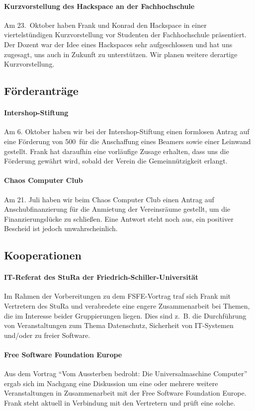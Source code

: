 \documentclass[10pt,DIV16]{scrartcl}
\begin{document}
\paragraph{Kurzvorstellung des Hackspace an der Fachhochschule}

Am 23.~Oktober haben Frank und Konrad den Hackspace in einer viertelstündigen
Kurzvorstellung vor Studenten der Fachhochschule präsentiert.  Der Dozent war
der Idee eines Hackspaces sehr aufgeschlossen und hat uns zugesagt, uns auch
in Zukunft zu unterstützen.  Wir planen weitere derartige Kurzvorstellung.

\subsection{Förderanträge}

\paragraph{Intershop-Stiftung}

Am 6. Oktober haben wir bei der Intershop-Stiftung einen formlosen
Antrag auf eine Förderung von 500\EUR\ für die Anschaffung eines
Beamers sowie einer Leinwand gestellt.  Frank hat daraufhin eine
vorläufige Zusage erhalten, dass uns die Förderung gewährt wird,
sobald der Verein die Gemeinnützigkeit erlangt.

\paragraph{Chaos Computer Club}

Am 21. Juli haben wir beim Chaos Computer Club einen Antrag auf
Anschubfinanzierung für die Anmietung der Vereinsräume gestellt, um die
Finanzierungslücke zu schließen. Eine Antwort steht noch aus, ein positiver
Bescheid ist jedoch unwahrscheinlich.


\subsection{Kooperationen}

\paragraph{IT-Referat des StuRa der Friedrich-Schiller-Universität}

Im Rahmen der Vorbereitungen zu dem FSFE-Vortrag traf sich Frank mit
Vertretern des StuRa und verabredete eine engere Zusammenarbeit bei
Themen, die im Interesse beider Gruppierungen liegen. Dies sind z.\,
B. die Durchführung von Veranstaltungen zum Thema Datenschutz,
Sicherheit von IT-Systemen und/oder zu freier Software.

\paragraph{Free Software Foundation Europe}

Aus dem Vortrag "`Vom Aussterben bedroht: Die Universalmaschine
Computer"' ergab sich im Nachgang eine Diskussion um eine oder
mehrere weitere Veranstaltungen in Zusammenarbeit mit der Free
Software Foundation Europe. Frank steht aktuell in Verbindung mit
den Vertretern und prüft eine solche.
\end{document}
